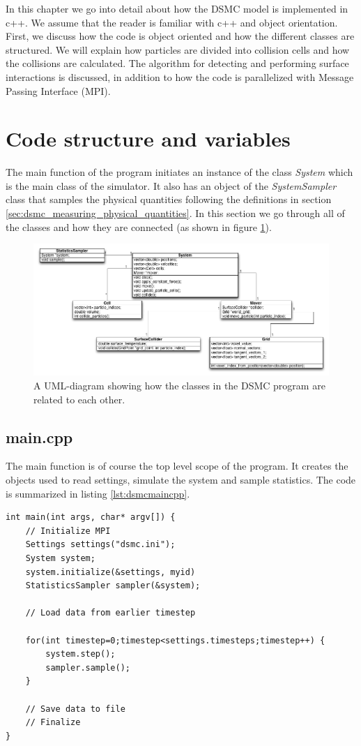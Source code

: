 In this chapter we go into detail about how the DSMC model is implemented in c++. We assume that the reader is familiar with c++ and object orientation. First, we discuss how the code is object oriented and how the different classes are structured. We will explain how particles are divided into collision cells and how the collisions are calculated. The algorithm for detecting and performing surface interactions is discussed, in addition to how the code is parallelized with Message Passing Interface (MPI).


\section{Code structure and variables}
The main function of the program initiates an instance of the class \textit{System} which is the main class of the simulator. It also has an object of the \textit{SystemSampler} class that samples the physical quantities following the definitions in section \ref{sec:dsmc_measuring_physical_quantities}. In this section we go through all of the classes and how they are connected (as shown in figure \ref{fig:dsmc_uml_diagram}). 
\begin{figure}[h]
\begin{center}
\includegraphics[width=\textwidth, trim=0cm 0cm 0cm 0cm, clip]{DSMC/figures/dsmcuml.png}
\end{center}
\caption{A UML-diagram showing how the classes in the DSMC program are related to each other.}
\label{fig:dsmc_uml_diagram}
\end{figure}
\subsection{main.cpp}
The main function is of course the top level scope of the program. It creates the objects used to read settings, simulate the system and sample statistics. The code is summarized in listing \ref{lst:dsmcmaincpp}.
\begin{lstlisting}[caption=main.cpp, label=lst:dsmcmaincpp]
int main(int args, char* argv[]) {
    // Initialize MPI
    Settings settings("dsmc.ini");
    System system;
    system.initialize(&settings, myid)
    StatisticsSampler sampler(&system);
    
    // Load data from earlier timestep

    for(int timestep=0;timestep<settings.timesteps;timestep++) {
    	system.step();
    	sampler.sample();
    }

    // Save data to file
    // Finalize
}
\end{lstlisting}
